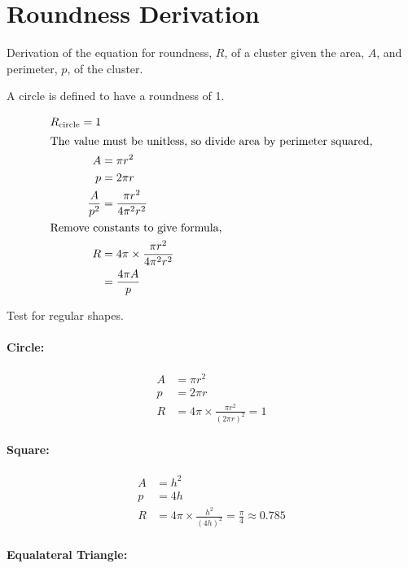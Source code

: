 
\section{Roundness Derivation}
\label{app:roundness_derivation}

Derivation of the equation for roundness, $R$, of a cluster given the area,
$A$, and perimeter, $p$, of the cluster.

A circle is defined to have a roundness of 1.

\begin{align}
	R_\textrm{circle} = 1 \\
\intertext{The value must be unitless, so divide area by perimeter squared,}
	A &= \pi r^2 \\
	p &= 2\pi r \\
	\frac{A}{p^2} &= \frac{\pi r^2}{4\pi^2 r^2} \\
\intertext{Remove constants to give formula,}
	R &= 4\pi \times \frac{\pi r^2}{4\pi^2 r^2} \\
		&= \frac{4\pi A}{p}
\end{align}

Test for regular shapes.

\paragraph{Circle:}
\label{par:circle}

\begin{align}
	A &= \pi r^2 \\
	p &= 2\pi r \\
	R &= 4\pi \times \frac{\pi r^2}{{(2\pi r)}^2} = 1
\end{align}

\paragraph{Square:}
\label{par:square}

\begin{align}
	A &= h^2 \\
	p &= 4h \\
	R &= 4\pi \times \frac{h^2}{{(4h)}^2} = \frac{\pi}{4} \approx 0.785
\end{align}

\paragraph{Equalateral Triangle:}
\label{par:equalateral_triangle}

